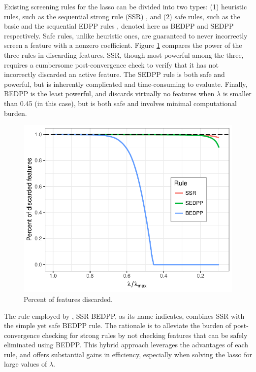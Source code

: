Existing screening rules for the lasso can be divided into two types: (1) heuristic rules, such as the sequential strong rule (SSR) \citep{tibshirani2012strong}, and (2) safe rules, such as the basic and the sequential EDPP rules \citep{JMLR:v16:wang15a}, denoted here as BEDPP and SEDPP respectively. Safe rules, unlike heuristic ones, are guaranteed to never incorrectly screen a feature with a nonzero coefficient.  Figure \ref{fig:rule_compare} compares the power of the three rules in discarding features. SSR, though most powerful among the three, requires a cumbersome post-convergence check to verify that it has not incorrectly discarded an active feature.  The SEDPP rule is both safe and powerful, but is inherently complicated and time-consuming to evaluate. Finally, BEDPP is the least powerful, and discards virtually no features when $\lambda$ is smaller than 0.45 (in this case), but is both safe and involves minimal computational burden.

\begin{figure}[htbp]
    \centering
    \includegraphics[scale=0.7]{Figures/Fig_1_three_rules_breast.pdf}
    \caption{Percent of features discarded.}
    \label{fig:rule_compare}
\end{figure}

The rule employed by , SSR-BEDPP, as its name indicates, combines
SSR with the simple yet safe BEDPP rule. The rationale is to alleviate the
burden of post-convergence checking for strong rules by not checking features
that can be safely eliminated using BEDPP.  This hybrid approach leverages the
advantages of each rule, and offers substantial gains in efficiency,
especially when solving the lasso for large values of $\lambda$.

